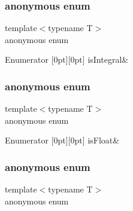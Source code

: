 \subsubsection{\texorpdfstring{anonymous enum}{anonymous enum}}
{\footnotesize\ttfamily template$<$typename T$>$ \\
anonymous enum}

\begin{DoxyEnumFields}{Enumerator}
[0pt][0pt]{}\mbox{\label{classUtil_1_1TypeTraits_acc1045f8d39d125327d6ad2144e39a8eae3cb8ddfe928cd1a6dc3438e54a5b74f}} 
is\+Integral&\\
\hline

\end{DoxyEnumFields}
\mbox{\label{classUtil_1_1TypeTraits_af8a5cd6a601e3f7558023df10c14b7de}} 
\subsubsection{\texorpdfstring{anonymous enum}{anonymous enum}}
{\footnotesize\ttfamily template$<$typename T$>$ \\
anonymous enum}

\begin{DoxyEnumFields}{Enumerator}
[0pt][0pt]{}\mbox{\label{classUtil_1_1TypeTraits_adba440f389541bf50f3736debd287d65a53a8c88c40192f095328053a89109888}} 
is\+Float&\\
\hline

\end{DoxyEnumFields}
\mbox{\label{classUtil_1_1TypeTraits_a510639a2e0b98d212be34917a69f86fa}} 
\subsubsection{\texorpdfstring{anonymous enum}{anonymous enum}}
{\footnotesize\ttfamily template$<$typename T$>$ \\
anonymous enum}

